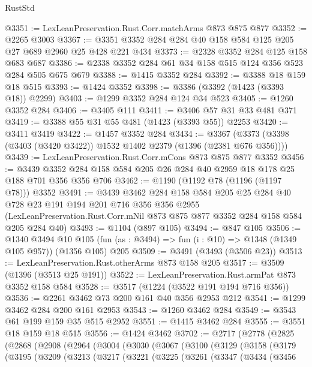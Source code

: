 \begin{lexlean}{RustStd}
\begin{coremodule}
@3351 := LexLeanPreservation.Rust.Corr.matchArms @873 @875 @877
@3352 := @2265 @3003
@3367 := @3351 @3352 @284 @284 @40 @158 @584 @125 @205 @27 @689 @2960 @25 @428 @221 @434
@3373 := @2328 @3352 @284 @125 @158 @683 @687
@3386 := @2338 @3352 @284 @61 @34 @158 @515 @124 @356 @523 @284 @505 @675 @679
@3388 := @1415 @3352 @284
@3392 := @3388 @18 @159 @18 @515
@3393 := @1424 @3352
@3398 := @3386 (@3392 (@1423 (@3393 @18)) @2299)
@3403 := @1299 @3352 @284 @124 @34 @523
@3405 := @1260 @3352 @284
@3406 := @3405 @111
@3411 := @3406 @57 @31 @33 @481 @371
@3419 := @3388 @55 @31 @55 @481 (@1423 (@3393 @55)) @2253
@3420 := @3411 @3419
@3422 := @1457 @3352 @284
@3434 := @3367 (@3373 (@3398 (@3403 (@3420 @3422)) @1532 @1402 @2379 (@1396 (@2381 @676 @356))))
@3439 := LexLeanPreservation.Rust.Corr.mCons @873 @875 @877 @3352
@3456 := @3439 @3352 @284 @158 @584 @205 @26 @284 @40 @2959 @18 @178 @25 @188 @701 @356 @356 @706
@3462 := @1190 (@1192 @78 (@1196 (@1197 @78))) @3352
@3491 := @3439
    @3462
    @284
    @158
    @584
    @205
    @25
    @284
    @40
    @728
    @23
    @191
    @194
    @201
    @716
    @356
    @356
    @2955
    (LexLeanPreservation.Rust.Corr.mNil @873 @875 @877 @3352 @284 @158 @584 @205 @284 @40)
@3493 := @1104 (@897 @105)
@3494 := @847 @105
@3506 := @1340
    @3494
    @10
    @105
    (fun (as : @3494) => fun (i : @10) => @1348 (@1349 @105 @957))
    (@1356 @105)
    @205
@3509 := @3491 (@3493 (@3506 @23))
@3513 := LexLeanPreservation.Rust.otherArms @873 @158 @205
@3517 := @3509 (@1396 (@3513 @25 @191))
@3522 := LexLeanPreservation.Rust.armPat @873 @3352 @158 @584
@3528 := @3517 (@1224 (@3522 @191 @194 @716 @356))
@3536 := @2261 @3462 @73 @200 @161 @40 @356 @2953 @212
@3541 := @1299 @3462 @284 @200 @161 @2953
@3543 := @1260 @3462 @284
@3549 := @3543 @61 @199 @159 @35 @515 @2952
@3551 := @1415 @3462 @284
@3555 := @3551 @18 @159 @18 @515
@3556 := @1424 @3462
@3702 := @2717
    (@2778
      (@2825
        (@2868
          (@2908
            (@2964
              (@3004
                (@3030
                  (@3067
                    (@3100
                      (@3129
                        (@3158
                          (@3179
                            (@3195
                              (@3209
                                (@3213
                                  (@3217
                                    (@3221
                                      (@3225
                                        (@3261
                                          (@3347
                                            (@3434
                                              (@3456

\end{coremodule}
\end{lexlean}
